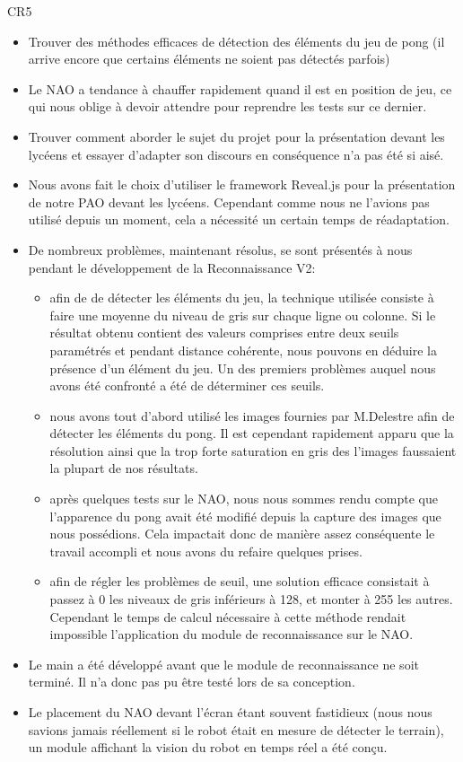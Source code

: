  \par CR5
  \begin{itemize}
    \item Trouver des méthodes efficaces de détection des éléments du jeu de pong (il arrive encore que certains éléments ne soient pas détectés parfois)
    \item Le NAO a tendance à chauffer rapidement quand il est en position de jeu, ce qui nous oblige à devoir attendre pour reprendre les tests sur ce dernier.
    \item Trouver comment aborder le sujet du projet pour la présentation devant les lycéens et essayer d’adapter son discours en conséquence n’a pas été si aisé.
    \item Nous avons fait le choix d’utiliser le framework Reveal.js pour la présentation de notre PAO devant les lycéens.
    Cependant comme nous ne l’avions pas utilisé depuis un moment, cela a nécessité un certain temps de réadaptation.
    \item De nombreux problèmes, maintenant résolus, se sont présentés à nous pendant le développement de la Reconnaissance V2:
          \begin{itemize}
            \item afin de de détecter les éléments du jeu, la technique utilisée consiste à faire une moyenne du niveau de gris sur chaque ligne ou colonne.
            Si le résultat obtenu contient des valeurs comprises entre deux seuils paramétrés et pendant distance cohérente, nous pouvons en déduire la présence d’un élément du jeu.
            Un des premiers problèmes auquel nous avons été confronté a été de déterminer ces seuils.
            \item nous avons tout d’abord utilisé les images fournies par M.Delestre afin de détecter les éléments du pong.
            Il est cependant rapidement apparu que la résolution ainsi que la trop forte saturation en gris des l’images faussaient la plupart de nos résultats.
            \item après quelques tests sur le NAO, nous nous sommes rendu compte que l’apparence du pong avait été modifié depuis la capture des images que nous possédions.
            Cela impactait donc de manière assez conséquente le travail accompli et nous avons du refaire quelques prises.
            \item afin de régler les problèmes de seuil, une solution efficace consistait à passez à 0 les niveaux de gris inférieurs à 128, et monter à 255 les autres.
            Cependant le temps de calcul nécessaire à cette méthode rendait impossible l’application du module de reconnaissance sur le NAO.
          \end{itemize}
    \item Le main a été développé avant que le module de reconnaissance ne soit terminé.
    Il n’a donc pas pu être testé lors de sa conception.
    \item Le placement du NAO devant l’écran étant souvent fastidieux (nous nous savions jamais réellement si le robot était en mesure de détecter le terrain),
    un module affichant la vision du robot en temps réel a été conçu.\\
  \end{itemize}
\pagebreak

